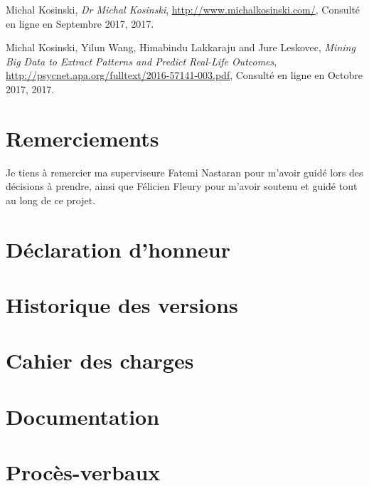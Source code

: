 \begin{thebibliography}{9}

  Michal Kosinski,
  \emph{Dr Michal Kosinski},
  \url{http://www.michalkosinski.com/},
  Consulté en ligne en Septembre 2017,
  2017.

  Michal Kosinski, Yilun Wang, Himabindu Lakkaraju and Jure Leskovec,
  \emph{Mining Big Data to Extract Patterns and Predict Real-Life Outcomes},
  \url{http://psycnet.apa.org/fulltext/2016-57141-003.pdf},
  Consulté en ligne en Octobre 2017,
  2017.

\end{thebibliography}

\printglossary

\chapter*{Remerciements}
Je tiens à remercier ma superviseure Fatemi Nastaran pour m'avoir guidé lors des décisions à prendre, ainsi que Félicien Fleury pour m'avoir soutenu et guidé tout au long de ce projet.

\chapter*{Déclaration d'honneur}


\appendix

\chapter{Historique des versions}


\chapter{Cahier des charges}


\chapter{Documentation}


% 

\chapter{Procès-verbaux}




